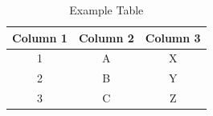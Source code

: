 \documentclass[12pt]{article}
\begin{document}
\begin{table}[htbp]
    \centering
    \caption{Example Table}
    \label{tab:example}
    \begin{tabular}{ccc}
        \toprule
        \textbf{Column 1} & \textbf{Column 2} & \textbf{Column 3} \\
        \midrule
        1 & A & X \\
        2 & B & Y \\
        3 & C & Z \\
        \bottomrule
    \end{tabular}
\end{table}

\lipsum[33]

\end{document}
